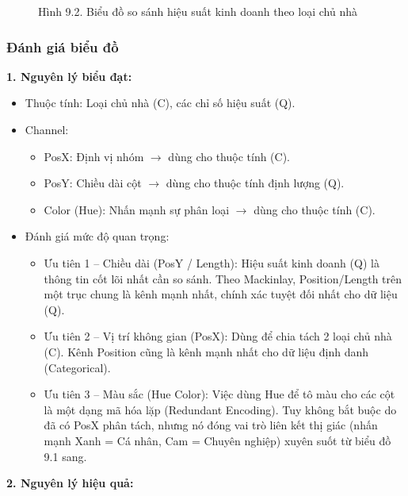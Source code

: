 \begin{figure}[H]
    \centering
    \caption{Hình 9.2. Biểu đồ so sánh hiệu suất kinh doanh theo loại chủ nhà}
    \label{fig:domain-task9-chart2}
\end{figure}

\subsubsection{Đánh giá biểu đồ}

\textbf{1. Nguyên lý biểu đạt:}

\begin{itemize}
    \item Thuộc tính: Loại chủ nhà (C), các chỉ số hiệu suất (Q).
    \item Channel:
    \begin{itemize}
        \item PosX: Định vị nhóm $\rightarrow$ dùng cho thuộc tính (C).
        \item PosY: Chiều dài cột $\rightarrow$ dùng cho thuộc tính định lượng (Q).
        \item Color (Hue): Nhấn mạnh sự phân loại $\rightarrow$ dùng cho thuộc tính (C).
    \end{itemize}
    \item Đánh giá mức độ quan trọng:
    \begin{itemize}
        \item Ưu tiên 1 -- Chiều dài (PosY / Length): Hiệu suất kinh doanh (Q) là thông tin cốt lõi nhất cần so sánh. Theo Mackinlay, Position/Length trên một trục chung là kênh mạnh nhất, chính xác tuyệt đối nhất cho dữ liệu (Q).
        \item Ưu tiên 2 -- Vị trí không gian (PosX): Dùng để chia tách 2 loại chủ nhà (C). Kênh Position cũng là kênh mạnh nhất cho dữ liệu định danh (Categorical).
        \item Ưu tiên 3 -- Màu sắc (Hue Color): Việc dùng Hue để tô màu cho các cột là một dạng mã hóa lặp (Redundant Encoding). Tuy không bắt buộc do đã có PosX phân tách, nhưng nó đóng vai trò liên kết thị giác (nhấn mạnh Xanh = Cá nhân, Cam = Chuyên nghiệp) xuyên suốt từ biểu đồ 9.1 sang.
    \end{itemize}
\end{itemize}

\textbf{2. Nguyên lý hiệu quả:}


